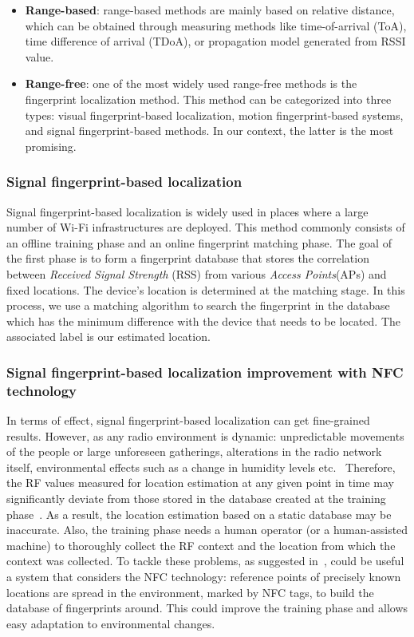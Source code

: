\begin{itemize}
	\item \textbf{Range-based}: range-based methods are mainly based on relative distance, which can be obtained through measuring methods like
	      time-of-arrival (ToA), time difference of arrival (TDoA), or propagation model generated from RSSI value.
	\item \textbf{Range-free}: one of the most widely used range-free methods is the fingerprint localization method.
	      This method can be categorized into three types:
	      visual fingerprint-based localization, motion fingerprint-based systems, and signal fingerprint-based methods.
	      In our context, the latter is the most promising.
\end{itemize}

\subsubsection{Signal fingerprint-based localization}
Signal fingerprint-based localization is widely used in places where a large number of Wi-Fi infrastructures are deployed.
This method commonly consists of an offline training phase and an online fingerprint matching phase.
The goal of the first phase is to form a fingerprint database that stores the correlation between \textit{Received Signal Strength} (RSS) from
various \textit{Access Points}(APs) and fixed locations. The device's location is determined at the matching stage.
In this process, we use a matching algorithm to search the fingerprint in the database which has the minimum difference with the device that needs to
be located. The associated label is our estimated location.

\subsubsection{Signal fingerprint-based localization improvement with NFC technology}
In terms of effect, signal fingerprint-based localization can get fine-grained results.
However, as any radio environment is dynamic: unpredictable movements of the people or large unforeseen gatherings,
alterations in the radio network itself, environmental effects such as a change in humidity levels etc.~\cite{chaudhry2013indoor}
Therefore, the RF values measured for location estimation at any given point in time may significantly deviate from
those stored in the database created at the training phase~\cite{chaudhry2013indoor}.
As a result, the location estimation based on a static database may be inaccurate.
Also, the training phase needs a human operator (or a human-assisted machine) to thoroughly collect the RF context and
the location from which the context was collected.
To tackle these problems, as suggested in~\cite{chaudhry2013indoor}, could be useful a system that considers the NFC technology:
reference points of precisely known locations are spread in the environment, marked by NFC tags, to build the database of fingerprints around.
This could improve the training phase and allows easy adaptation to environmental changes.

